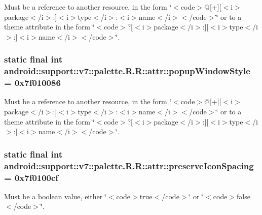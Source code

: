 Must be a reference to another resource, in the form \char`\"{}$<$code$>$@\mbox{[}+\mbox{]}\mbox{[}$<$i$>$package$<$/i$>$:\mbox{]}$<$i$>$type$<$/i$>$:$<$i$>$name$<$/i$>$$<$/code$>$\char`\"{} or to a theme attribute in the form \char`\"{}$<$code$>$?\mbox{[}$<$i$>$package$<$/i$>$:\mbox{]}\mbox{[}$<$i$>$type$<$/i$>$:\mbox{]}$<$i$>$name$<$/i$>$$<$/code$>$\char`\"{}. \hypertarget{classandroid_1_1support_1_1v7_1_1palette_1_1_r_1_1attr_403aef963c28e36bec27990287ebeaa8}{
\subsubsection[{popupWindowStyle}]{\setlength{\rightskip}{0pt plus 5cm}static final int android::support::v7::palette.R.R::attr::popupWindowStyle = 0x7f010086}}
\label{classandroid_1_1support_1_1v7_1_1palette_1_1_r_1_1attr_403aef963c28e36bec27990287ebeaa8}


Must be a reference to another resource, in the form \char`\"{}$<$code$>$@\mbox{[}+\mbox{]}\mbox{[}$<$i$>$package$<$/i$>$:\mbox{]}$<$i$>$type$<$/i$>$:$<$i$>$name$<$/i$>$$<$/code$>$\char`\"{} or to a theme attribute in the form \char`\"{}$<$code$>$?\mbox{[}$<$i$>$package$<$/i$>$:\mbox{]}\mbox{[}$<$i$>$type$<$/i$>$:\mbox{]}$<$i$>$name$<$/i$>$$<$/code$>$\char`\"{}. \hypertarget{classandroid_1_1support_1_1v7_1_1palette_1_1_r_1_1attr_2618bd35a061b96551dfd150ae7ec17c}{
\subsubsection[{preserveIconSpacing}]{\setlength{\rightskip}{0pt plus 5cm}static final int android::support::v7::palette.R.R::attr::preserveIconSpacing = 0x7f0100cf}}
\label{classandroid_1_1support_1_1v7_1_1palette_1_1_r_1_1attr_2618bd35a061b96551dfd150ae7ec17c}


Must be a boolean value, either \char`\"{}$<$code$>$true$<$/code$>$\char`\"{} or \char`\"{}$<$code$>$false$<$/code$>$\char`\"{}. 

